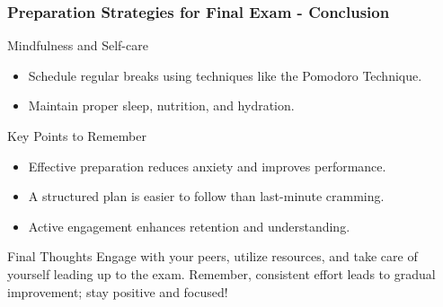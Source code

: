 \documentclass{beamer}
\begin{document}
\begin{frame}[fragile]
    \frametitle{Preparation Strategies for Final Exam - Conclusion}
    \begin{block}{Mindfulness and Self-care}
        \begin{itemize}
            \item Schedule regular breaks using techniques like the Pomodoro Technique.
            \item Maintain proper sleep, nutrition, and hydration.
        \end{itemize}
    \end{block}
    
    \begin{block}{Key Points to Remember}
        \begin{itemize}
            \item Effective preparation reduces anxiety and improves performance.
            \item A structured plan is easier to follow than last-minute cramming.
            \item Active engagement enhances retention and understanding.
        \end{itemize}
    \end{block}

    \begin{block}{Final Thoughts}
        Engage with your peers, utilize resources, and take care of yourself leading up to the exam. Remember, consistent effort leads to gradual improvement; stay positive and focused!
    \end{block}
\end{frame}
\end{document}
